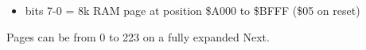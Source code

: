 \begin{itemize}
\item bits 7-0 = 8k RAM page at position \$A000 to \$BFFF (\$05 on
  reset)
\end{itemize}
Pages can be from 0 to 223 on a fully expanded Next.

